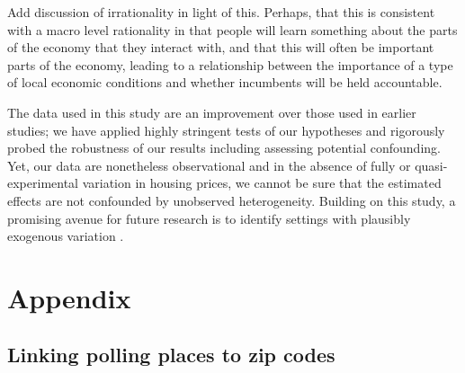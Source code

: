 \documentclass[12pt,a4paper]{article}
\begin{document}
	Add discussion of irrationality in light of this. Perhaps, that this is consistent with a macro level rationality in that people will learn something about the parts of the economy that they interact with, and that this will often be important parts of the economy, leading to a relationship between the importance of a type of local economic conditions and whether incumbents will be held accountable.
	
	The data used in this study are an improvement over those used in earlier studies; we have applied highly stringent tests of our hypotheses and rigorously probed the robustness of our results including assessing potential confounding. Yet, our data are nonetheless observational and in the absence of fully or quasi-experimental variation in housing prices, we cannot be sure that the estimated effects are not confounded by unobserved heterogeneity. Building on this study, a promising avenue for future research is to identify settings with plausibly exogenous variation \citep[cf.]{jerzak2016property}.
	
	
	
	
	
	
	
	
	
	
	
	\clearpage
	
	\singlespacing
	
	
	
	
	\newpage
	
	\appendix
	\section*{Appendix}
	\renewcommand{\thesubsection}{\Alph{subsection}}
	\renewcommand{\thetable}{\Alph{subsection}\arabic{table}}
	
	\localtableofcontents
	
	
	\subsection{Linking polling places to zip codes}\label{app_linking}
	
\end{document}
